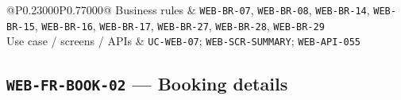\begin{longtable}{@{}P{0.23000\SRSWidth}P{0.77000\SRSWidth}@{}}
Business rules & \texttt{WEB-\allowbreak{}BR-\allowbreak{}07}, \texttt{WEB-\allowbreak{}BR-\allowbreak{}08}, \texttt{WEB-\allowbreak{}BR-\allowbreak{}14}, \texttt{WEB-\allowbreak{}BR-\allowbreak{}15}, \texttt{WEB-\allowbreak{}BR-\allowbreak{}16}, \texttt{WEB-\allowbreak{}BR-\allowbreak{}17}, \texttt{WEB-\allowbreak{}BR-\allowbreak{}27}, \texttt{WEB-\allowbreak{}BR-\allowbreak{}28}, \texttt{WEB-\allowbreak{}BR-\allowbreak{}29} \\[3pt]
Use case /\allowbreak{} screens /\allowbreak{} APIs & \texttt{UC-\allowbreak{}WEB-\allowbreak{}07}; \texttt{WEB-\allowbreak{}SCR-\allowbreak{}SUMMARY}; \texttt{WEB-\allowbreak{}API-\allowbreak{}055} \\[3pt]
\end{longtable}
\endgroup

\subsection{\texttt{WEB-\allowbreak{}FR-\allowbreak{}BOOK-\allowbreak{}02} — Booking details}
\begingroup
\fontsize{9.5}{12}\selectfont
\setlength{\SRSWidth}{\dimexpr\linewidth-2\tabcolsep\relax}
